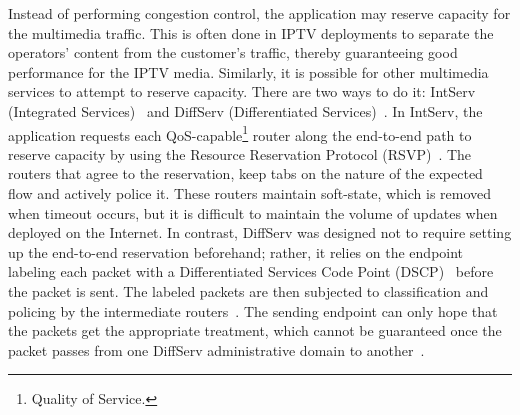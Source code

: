 Instead of performing congestion control, the application may reserve capacity
for the multimedia traffic. This is often done in IPTV deployments to
separate the operators' content from the customer's traffic, thereby
guaranteeing good performance for the IPTV media. Similarly, it is possible
for other multimedia services to attempt to reserve capacity. There are two
ways to do it: IntServ (Integrated Services)~\cite{rfc1633} and DiffServ
(Differentiated Services)~\cite{rfc2474}. In IntServ, the application requests
each QoS-capable\footnote{Quality of Service.} router along the end-to-end path to reserve capacity by
using the Resource Reservation Protocol (RSVP)~\cite{rfc2205}. The routers
that agree to the reservation, keep tabs on the nature of the expected flow
and actively police it. These routers maintain soft-state, which is removed
when timeout occurs, but it is difficult to maintain the volume of updates
when deployed on the Internet. In contrast, DiffServ was designed not to
require setting up the end-to-end reservation beforehand; rather, it relies on the
endpoint labeling each packet with a Differentiated Services
Code Point (DSCP)~\cite{rfc2475} before the packet is sent. The labeled packets are then subjected to
classification and policing by the intermediate routers~\cite{rfc5865}. The
sending endpoint can only hope that the packets get the appropriate treatment,
which cannot be guaranteed once the packet passes from one DiffServ
administrative domain to another~\cite{draft.rtcweb.qos}.





